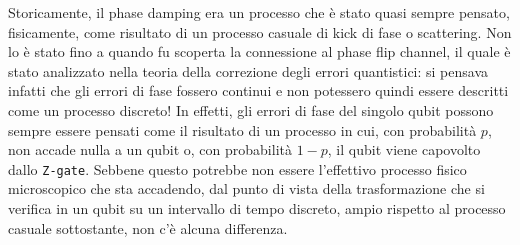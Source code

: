 \noindent Storicamente, il phase damping era un processo che è stato quasi sempre pensato, fisicamente, come risultato di un processo casuale di kick di fase o scattering. Non lo è stato fino a quando fu scoperta la connessione al phase flip channel, il quale è stato analizzato nella teoria della correzione degli errori quantistici: si pensava infatti che gli errori di fase fossero continui e non potessero quindi essere descritti come un processo discreto! In effetti, gli errori di fase del singolo qubit possono sempre essere pensati come il risultato di un processo in cui, con probabilità $p$, non accade nulla a un qubit o, con probabilità $1-p$, il qubit viene capovolto dallo \texttt{Z-gate}. Sebbene questo potrebbe non essere l'effettivo processo fisico microscopico che sta accadendo, dal punto di vista della trasformazione che si verifica in un qubit su un intervallo di tempo discreto, ampio rispetto al processo casuale sottostante, non c'è alcuna differenza.

